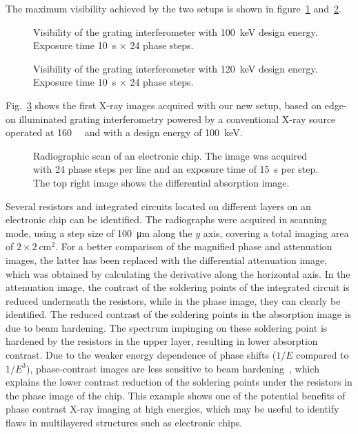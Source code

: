The maximum visibility achieved by the two setups is shown in 
figure~\ref{fig:visibility100} and~\ref{fig:visibility120}.

\begin{figure}[htb]
    \centering
    
    \caption[Visibility \SI{100}{\kilo\eV}.]{Visibility of the grating
        interferometer with
        \SI{100}{\kilo\eV} design energy. Exposure time \SI{10}{\second}
        $\times$ \num{24} phase steps.}
    \label{fig:visibility100}
\end{figure}
\begin{figure}[htb]
    \centering
    
    \caption[Visibility \SI{120}{\kilo\eV}.]{Visibility of the grating
        interferometer with
        \SI{120}{\kilo\eV} design energy. Exposure time \SI{10}{\second}
        $\times$ \num{24} phase steps.}
    \label{fig:visibility120}
\end{figure}

Fig.~\ref{Fig:img_chip} shows the first X-ray images acquired with our new setup, based on
edge-on illuminated grating interferometry powered by a conventional X-ray
source operated at \SI{160}{\kilo\voltpeak} and with a design energy of
\SI{100}{\kilo\eV}.  
\begin{figure}[h!]
    \centering
    
    \caption{Radiographic scan of an electronic chip. The image was acquired
        with 24 phase steps per line and an exposure time of \SI{15}{\second} per
    step. The top right image shows the differential absorption image.}\label{Fig:img_chip}
\end{figure}
Several resistors and integrated circuits located on different
layers on an electronic chip can be identified. The radiographs were acquired in scanning
mode, using a step size of \SI{100}{\micro\metre} along the $y$ axis, covering a total imaging
area of $2 \times \SI{2}{\centi\metre^2}$. For a better comparison of the magnified phase and
attenuation images, the latter has been replaced with the differential
attenuation image, which was obtained by calculating the derivative along
the horizontal axis. In the attenuation image, the contrast of the soldering
points of the integrated circuit is reduced underneath the resistors, while
in the phase image, they can clearly be identified. The reduced contrast of
the soldering points in the absorption image is due to beam hardening. The
spectrum impinging on these soldering point is hardened by the resistors in
the upper layer, resulting in lower absorption contrast. Due to the weaker
energy dependence of phase shifts ($1/E$ compared to $1/E^3$), phase-contrast
images are less sensitive to beam hardening~\cite{Chabior2011a}, which explains the lower
contrast reduction of the soldering points under the resistors in the
phase image of the chip. This example shows one of the potential benefits of
phase contrast X-ray imaging at high energies, which may be useful to
identify flaws in multilayered structures such as electronic chips.

